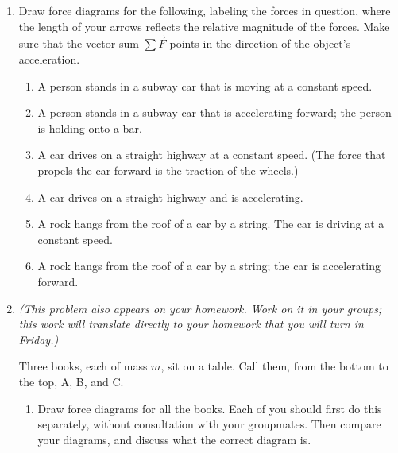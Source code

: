\documentclass[12pt]{article}
\begin{document}
\Large
\centerline{}
\normalsize
\centerline{}

\begin{enumerate}

\item Draw force diagrams for the following, labeling the forces in question, where the length of your arrows reflects the relative magnitude of the forces.
 Make sure that the vector sum $\sum \vec F$ points in the direction of the object's acceleration.

\begin{enumerate}

\item A person stands in a subway car that is moving at a constant speed.
\vspace{2in}
\item A person stands in a subway car that is accelerating forward; the person is holding onto a bar.

\vspace{2in}
\item A car drives on a straight highway at a constant speed. (The force that propels the car forward is the traction of the wheels.)

\vspace{2in}
\item A car drives on a straight highway and is accelerating.

\vspace{2in}
\item A rock hangs from the roof of a car by a string. The car is driving at a constant speed.

\vspace{2in}
\item A rock hangs from the roof of a car by a string; the car is accelerating forward.

\end{enumerate}

\newpage
\item {\it (This problem also appears on your homework. Work on it in your groups; this work will translate directly to your homework that you will turn in Friday.)}

Three books, each of mass $m$, sit on a table. Call them, from the bottom
to the top, A, B, and C.

\begin{enumerate}
\item Draw force diagrams for all the books. Each of you should first do this
separately, without consultation with your groupmates. Then compare your 
diagrams, and discuss what the correct diagram is. 
\vspace{4in}


\end{enumerate}
\end{enumerate}
\end{document}
